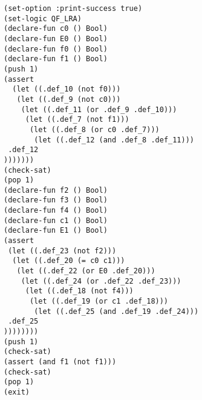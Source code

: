\documentclass[12pt]{article}
\begin{document}
\footnotesize
\begin{verbatim}
(set-option :print-success true)
(set-logic QF_LRA)
(declare-fun c0 () Bool)
(declare-fun E0 () Bool)
(declare-fun f0 () Bool)
(declare-fun f1 () Bool)
(push 1)
(assert 
  (let ((.def_10 (not f0)))
   (let ((.def_9 (not c0)))
    (let ((.def_11 (or .def_9 .def_10)))
     (let ((.def_7 (not f1)))
      (let ((.def_8 (or c0 .def_7)))
       (let ((.def_12 (and .def_8 .def_11)))
 .def_12
)))))))
(check-sat)
(pop 1)
(declare-fun f2 () Bool)
(declare-fun f3 () Bool)
(declare-fun f4 () Bool)
(declare-fun c1 () Bool)
(declare-fun E1 () Bool)
(assert 
 (let ((.def_23 (not f2)))
  (let ((.def_20 (= c0 c1)))
   (let ((.def_22 (or E0 .def_20)))
    (let ((.def_24 (or .def_22 .def_23)))
     (let ((.def_18 (not f4)))
      (let ((.def_19 (or c1 .def_18)))
       (let ((.def_25 (and .def_19 .def_24)))
 .def_25
))))))))
(push 1)
(check-sat)
(assert (and f1 (not f1)))
(check-sat)
(pop 1)
(exit)
\end{verbatim}
\end{document}
